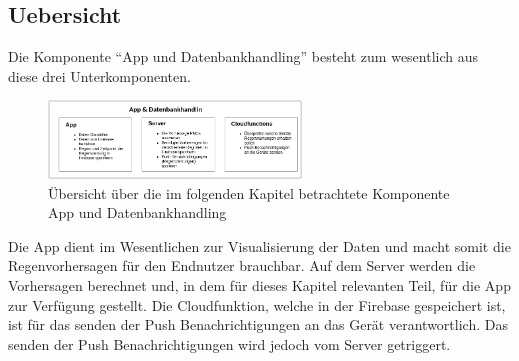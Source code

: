 \subsection{Uebersicht}\label{uebersicht}
Die Komponente “App und Datenbankhandling” besteht zum wesentlich aus diese drei Unterkomponenten.
\begin{figure}[htb]
 \centering
 \includegraphics[width=0.6\textwidth,angle=0]{abb/app_datenbank_komponente_uebersicht}
 \caption[Beschreibung]{Übersicht über die im folgenden Kapitel betrachtete Komponente App und Datenbankhandling}
\label{fig:Beschreibung}
\end{figure}

Die App dient im Wesentlichen zur Visualisierung der Daten und macht somit die Regenvorhersagen für den Endnutzer brauchbar. Auf dem Server werden die Vorhersagen berechnet und, in dem für dieses Kapitel relevanten Teil, für die App zur Verfügung gestellt. Die Cloudfunktion, welche in der Firebase gespeichert ist, ist für das senden der Push Benachrichtigungen an das Gerät verantwortlich. Das senden der Push Benachrichtigungen wird jedoch vom Server getriggert.  
